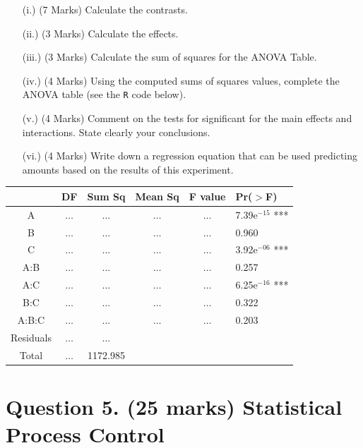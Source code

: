 \documentclass[a4paper,12pt]{article}
\begin{document}
\begin{itemize}
	\item[(i.)] (7 Marks) Calculate the contrasts.
	\item[(ii.)] (3 Marks) Calculate the effects.
	\item[(iii.)] (3 Marks) Calculate the sum of squares for the ANOVA Table.
	\item[(iv.)] (4 Marks) Using the computed sums of squares values, complete the ANOVA table (see the \texttt{R} code below).
	\item[(v.)] (4 Marks) Comment on the tests for significant for the main effects and interactions. State clearly your conclusions.
	\item[(vi.)] (4 Marks) Write down a regression equation that can be used predicting amounts based on the results of this experiment.
\end{itemize}
\begin{center}
	\begin{tabular}{|c|c|c|c|c|l|}\hline
		& DF & Sum Sq & Mean Sq & F value&   Pr($>$F)\\  
		\hline A & $\ldots$ & $\ldots$ & $\ldots$  & $\ldots$ &  7.39e$^{-15}$ ***\\ 
		\hline B & $\ldots$ & $\ldots$ & $\ldots$  & $\ldots$ &  0.960  \\ 
		\hline C &\phantom{m} $\ldots$ \phantom{m}  & $\ldots$ & $\ldots$  & $\ldots$ & 3.92e$^{-06}$ *** \\ 
		\hline A:B & $\ldots$ & $\ldots$ & $\ldots$  & $\ldots$ & 0.257 \\ 
		\hline A:C & $\ldots$ & $\ldots$ & $\ldots$  & $\ldots$ & 6.25e$^{-16}$ *** \\ 
		\hline B:C & $\ldots$ & $\ldots$ & $\ldots$  & $\ldots$ & 0.322  \\                 
		\hline A:B:C & $\ldots$ & $\ldots$ & $\ldots$  & $\ldots$ & 0.203  \\ 
		\hline Residuals & $\ldots$ & $\ldots$ &  & &  \\ \hline
		\hline Total & $\ldots$ & 1172.985 &  & &  \\ 	
		\hline 
	\end{tabular} 
\end{center}

\newpage




\section*{Question 5. (25 marks) Statistical Process Control }
\end{document}
